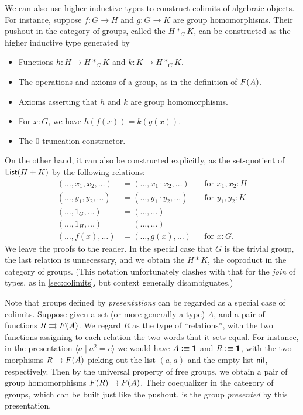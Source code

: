 %
We can also use higher inductive types to construct colimits of algebraic objects.
For instance, suppose $f:G\to H$ and $g:G\to K$ are group homomorphisms.
Their pushout in the category of groups, called the 
%
%
$H *_G K$, can be constructed as the higher inductive type generated by
\begin{itemize}
\item Functions $h:H\to H *_G K$ and $k:K\to H *_G K$.
\item The operations and axioms of a group, as in the definition of $F(A)$.
\item Axioms asserting that $h$ and $k$ are group homomorphisms.
\item For $x:G$, we have $h(f(x)) = k(g(x))$.
\item The $0$-truncation constructor.
\end{itemize}
On the other hand, it can also be constructed explicitly, as the set-quotient of $\mathsf{List}(H+K)$ by the following relations:
\begin{align*}
  (\dots, x_1, x_2, \dots) &= (\dots, x_1\cdot x_2, \dots)
  & &\text{for $x_1,x_2:H$}\\
  (\dots, y_1, y_2, \dots) &= (\dots, y_1\cdot y_2, \dots)
  & &\text{for $y_1,y_2:K$}\\
  (\dots, 1_G, \dots) &= (\dots, \dots) &&  \\
  (\dots, 1_H, \dots) &= (\dots, \dots) &&  \\
  (\dots, f(x), \dots) &= (\dots, g(x), \dots)
  & &\text{for $x:G$.}
\end{align*}
We leave the proofs to the reader.
In the special case that $G$ is the trivial group, the last relation is unnecessary, and we obtain the 
%
$H*K$, the coproduct in the category of groups.
(This notation unfortunately clashes with that for the \emph{join} of types, as in \cref{sec:colimits}, but context generally disambiguates.)

%
Note that groups defined by \emph{presentations} can be regarded as a special case of colimits.
Suppose given a set (or more generally a type) $A$, and a pair of functions $R\rightrightarrows F(A)$.
We regard $R$ as the type of ``relations'', with the two functions assigning to each relation the two words that it sets equal.
For instance, in the presentation $\langle a \mid a^2 = e \rangle$ we would have $A\vcentcolon\equiv \mathbf{1}$ and $R\vcentcolon\equiv \mathbf{1}$, with the two morphisms $R\rightrightarrows F(A)$ picking out the list $(a,a)$ and the empty list $\mathsf{nil}$, respectively.
Then by the universal property of free groups, we obtain a pair of group homomorphisms $F(R) \rightrightarrows F(A)$.
Their coequalizer in the category of groups, which can be built just like the pushout, is the group \emph{presented} by this presentation.

